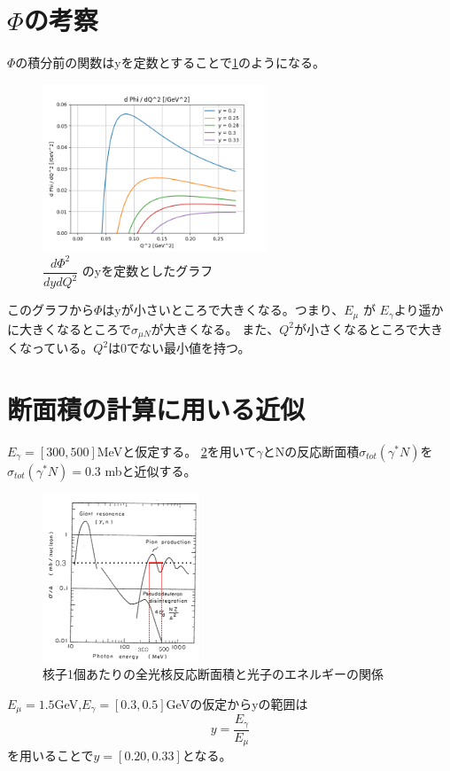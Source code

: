 \section{\texorpdfstring{$\Phi$}{LG}の考察}
$\Phi$の積分前の関数はyを定数とすることで\ref{fig:sigma3}のようになる。
\begin{figure}[H]
    \centering
    \includegraphics[height=5cm]{img/flux_fixed_y.png}
    \caption{$\dfrac{d\Phi ^2}{dydQ^2}$ のyを定数としたグラフ}
    \label{fig:sigma3}
\end{figure}

このグラフから$\Phi$はyが小さいところで大きくなる。つまり、$E_\mu$ が $E_\gamma$より遥かに大きくなるところで$\sigma_{\mu N}$が大きくなる。
また、$Q^2$が小さくなるところで大きくなっている。$Q^2$は0でない最小値を持つ。


\section{断面積の計算に用いる近似}
$E_\gamma = [300, 500]$MeVと仮定する。
\ref{fig:sigma4}を用いて$\gamma$とNの反応断面積$\sigma_{tot}(\gamma^* N)$を
$\sigma_{tot}(\gamma^* N) = 0.3$ mbと近似する。
\begin{figure}[H]
    \centering
    \includegraphics[height=5cm]{img/sigma_tot.png}
    \caption{核子1個あたりの全光核反応断面積と光子のエネルギーの関係}
    \label{fig:sigma4}
\end{figure}

$E_\mu = 1.5$GeV,$E_\gamma = [0.3, 0.5]$GeVの仮定からyの範囲は
\begin{equation}
    y = \dfrac{E_\gamma}{E_\mu}
\end{equation}
を用いることで$y = [0.20, 0.33]$となる。


